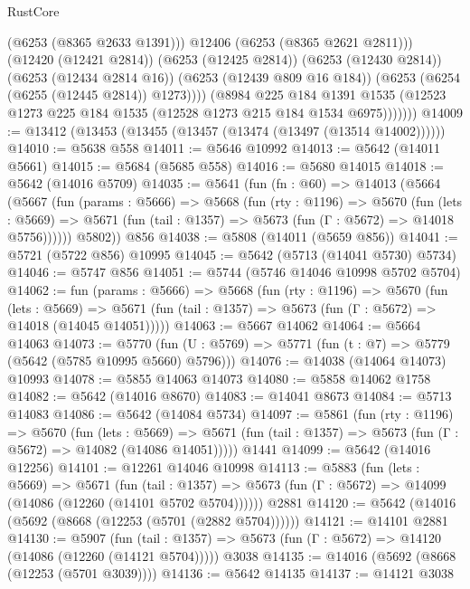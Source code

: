 \begin{lexlean}{RustCore}
\begin{coremodule}
                    (@6253 (@8365 @2633 @1391)))
                  @12406
                  (@6253 (@8365 @2621 @2811)))
                (@12420 (@12421 @2814))
                (@6253 (@12425 @2814))
                (@6253 (@12430 @2814))
                (@6253 (@12434 @2814 @16))
                (@6253 (@12439 @809 @16 @184))
                (@6253 (@6254 (@6255 (@12445 @2814)) @1273))))
            (@8984
              @225
              @184
              @1391
              @1535
              (@12523 @1273 @225 @184 @1535 (@12528 @1273 @215 @184 @1534 @6975)))))))
@14009 := @13412 (@13453 (@13455 (@13457 (@13474 (@13497 (@13514 @14002))))))
@14010 := @5638 @558
@14011 := @5646 @10992
@14013 := @5642 (@14011 @5661)
@14015 := @5684 (@5685 @558)
@14016 := @5680 @14015
@14018 := @5642 (@14016 @5709)
@14035 := @5641
    (fun (fn : @60) =>
    @14013
      (@5664
        (@5667
          (fun (params : @5666) =>
          @5668
            (fun (rty : @1196) =>
            @5670
              (fun (lets : @5669) =>
              @5671 (fun (tail : @1357) => @5673 (fun (Γ : @5672) => @14018 @5756))))))
        @5802))
    @856
@14038 := @5808 (@14011 (@5659 @856))
@14041 := @5721 (@5722 @856) @10995
@14045 := @5642 (@5713 (@14041 @5730) @5734)
@14046 := @5747 @856
@14051 := @5744 (@5746 @14046 @10998 @5702 @5704)
@14062 := fun (params : @5666) =>
  @5668
    (fun (rty : @1196) =>
    @5670
      (fun (lets : @5669) =>
      @5671 (fun (tail : @1357) => @5673 (fun (Γ : @5672) => @14018 (@14045 @14051)))))
@14063 := @5667 @14062
@14064 := @5664 @14063
@14073 := @5770
    (fun (U : @5769) => @5771 (fun (t : @7) => @5779 (@5642 (@5785 @10995 @5660) @5796)))
@14076 := @14038 (@14064 @14073) @10993
@14078 := @5855 @14063 @14073
@14080 := @5858 @14062 @1758
@14082 := @5642 (@14016 @8670)
@14083 := @14041 @8673
@14084 := @5713 @14083
@14086 := @5642 (@14084 @5734)
@14097 := @5861
    (fun (rty : @1196) =>
    @5670
      (fun (lets : @5669) =>
      @5671 (fun (tail : @1357) => @5673 (fun (Γ : @5672) => @14082 (@14086 @14051)))))
    @1441
@14099 := @5642 (@14016 @12256)
@14101 := @12261 @14046 @10998
@14113 := @5883
    (fun (lets : @5669) =>
    @5671
      (fun (tail : @1357) =>
      @5673 (fun (Γ : @5672) => @14099 (@14086 (@12260 (@14101 @5702 @5704))))))
    @2881
@14120 := @5642 (@14016 (@5692 (@8668 (@12253 (@5701 (@2882 @5704))))))
@14121 := @14101 @2881
@14130 := @5907
    (fun (tail : @1357) => @5673 (fun (Γ : @5672) => @14120 (@14086 (@12260 (@14121 @5704)))))
    @3038
@14135 := @14016 (@5692 (@8668 (@12253 (@5701 @3039))))
@14136 := @5642 @14135
@14137 := @14121 @3038

\end{coremodule}
\end{lexlean}
